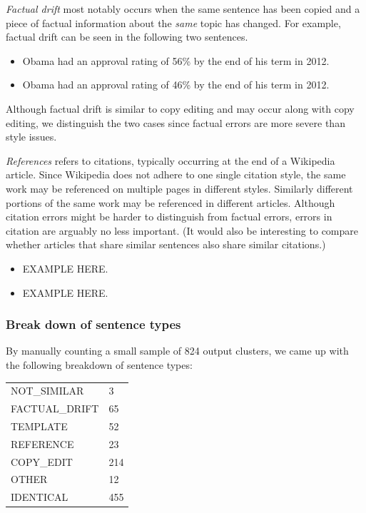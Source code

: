 \documentclass{acm_proc_article-sp}
\begin{document}
\emph{Factual drift} most notably occurs when the same sentence has been copied and a piece of factual information about the \emph{same} topic has changed. For example, factual drift can be seen in the following two sentences.
\begin{itemize}[noitemsep,nolistsep]
\item Obama had an approval rating of 56\% by the end of his term in 2012.
\item Obama had an approval rating of 46\% by the end of his term in 2012.
\end{itemize}
Although factual drift is similar to copy editing and may occur along with copy editing, we distinguish the two cases since factual errors are more severe than style issues.

\emph{References} refers to citations, typically occurring at the end of a Wikipedia article. Since Wikipedia does not adhere to one single citation style, the same work may be referenced on multiple pages in different styles. Similarly different portions of the same work may be referenced in different articles. Although citation errors might be harder to distinguish from factual errors, errors in citation are arguably no less important. (It would also be interesting to compare whether articles that share similar sentences also share similar citations.) 

\begin{itemize}[noitemsep,nolistsep]
\item EXAMPLE HERE.
\item EXAMPLE HERE.
\end{itemize}

\subsubsection{Break down of sentence types}

By manually counting a small sample of 824 output clusters, we came up with the following breakdown of sentence types:

\begin{tabular}{l l}
NOT\_SIMILAR & 3 \\
FACTUAL\_DRIFT & 65 \\
TEMPLATE & 52 \\
REFERENCE & 23 \\
COPY\_EDIT & 214 \\
OTHER & 12 \\
IDENTICAL & 455 \\
\end{tabular}
\end{document}
